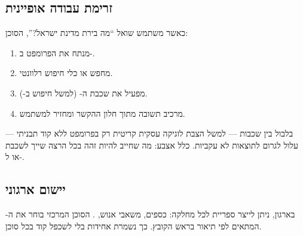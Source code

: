 
\subsection{זרימת עבודה אופיינית}

כאשר משתמש שואל ``מה בירת מדינת ישראל?'', הסוכן:
\begin{enumerate}[rightmargin=2em]
  \item מנתח את הפרומפט ב-.
  \item מחפש  או כלי חיפוש רלוונטי.
  \item מפעיל את שכבת ה- (למשל חיפוש ב-).
  \item מרכיב תשובה מתוך חלון ההקשר ומחזיר למשתמש.
\end{enumerate}

\begin{warningbox}
בלבול בין שכבות --- למשל הצבת לוגיקה עסקית קריטית רק בפרומפט ללא
קוד תבניתי --- עלול לגרום לתוצאות לא עקביות. כלל אצבע: מה שחייב
להיות זהה בכל הרצה שייך לשכבת  או ל-.
\end{warningbox}

\subsection{יישום ארגוני}

בארגון, ניתן לייצר ספריית  לכל מחלקה: כספים, משאבי אנוש,
. הסוכן המרכזי בוחר את ה- המתאים לפי תיאור בראש
הקובץ. כך נשמרת אחידות בלי לשכפל קוד בכל סוכן.
